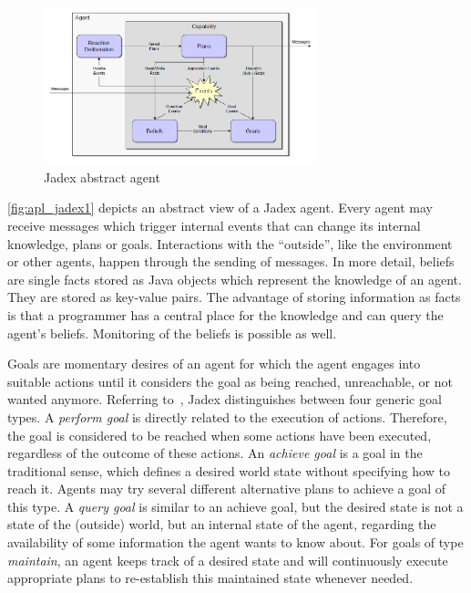 \begin{figure}
	\centering
	\includegraphics[width=300px]{images/Jadex_agent.png}
	\caption{Jadex abstract agent~\cite{pokahr_jadex_2005}}
	\label{fig:apl_jadex1}
\end{figure}
\autoref{fig:apl_jadex1} depicts an abstract view of a Jadex agent.
Every agent may receive messages which trigger internal events that can change its internal knowledge, plans or goals.
Interactions with the \enquote{outside}, like the environment or other agents, happen through the sending of messages. %
In more detail, beliefs are single facts stored as Java objects which represent the knowledge of an agent.
They are stored as key-value pairs.
The advantage of storing information as facts is that a programmer has a central place for the knowledge and can query the agent's beliefs. %
Monitoring of the beliefs is possible as well.

Goals are momentary desires of an agent for which the agent engages into suitable actions until it considers the goal as being reached, unreachable, or not wanted anymore.
Referring to~\cite{ActiveComponentsGoals}, Jadex distinguishes between four generic goal types.
A \emph{perform goal} is directly related to the execution of actions.
Therefore, the goal is considered to be reached when some actions have been executed, regardless of the outcome of these actions.
An \emph{achieve goal} is a goal in the traditional sense, which defines a desired world state without specifying how to reach it.
Agents may try several different alternative plans to achieve a goal of this type.
A \emph{query goal} is similar to an achieve goal, but the desired state is not a state of the (outside) world, but an internal state of the agent, regarding the availability of some information the agent wants to know about.
For goals of type \emph{maintain}, an agent keeps track of a desired state and will continuously execute appropriate plans to re-establish this maintained state whenever needed.

